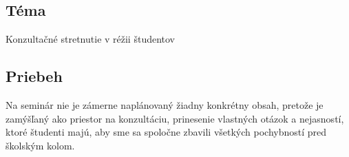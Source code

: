 
\subsection*{Téma}
Konzultačné stretnutie v réžii študentov

\subsection*{Priebeh}

Na seminár nie je zámerne naplánovaný žiadny konkrétny obsah, pretože je zamýšľaný ako priestor na konzultáciu, prinesenie vlastných otázok a nejasností, ktoré študenti majú, aby sme sa spoločne zbavili všetkých pochybností pred školským kolom.